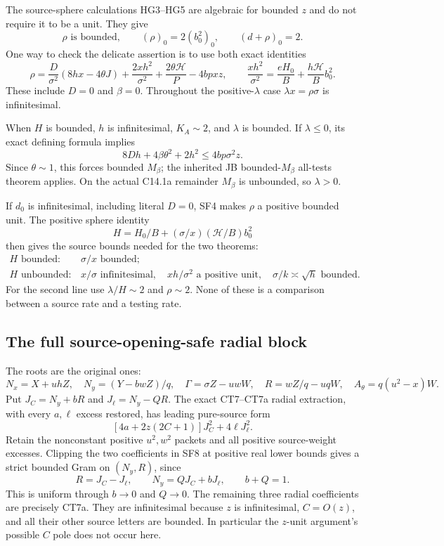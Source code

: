 The source-sphere calculations HG3--HG5 are algebraic for bounded
$z$ and do not require it to be a unit. They give
\[
 \rho\text{ is bounded},\qquad
 (\rho)_0=2(b_0^2)_0,\qquad (d+\rho)_0=2.
 \tag{SF4}
\]
One way to check the delicate assertion is to use both exact identities
\[
 \rho=\frac D{\sigma^2}(8hx-4\theta J)
       +\frac{2xh^2}{\sigma^2}
       +\frac{2\theta\mathcal H}{P}-4bpxz,
 \qquad
 \frac{xh^2}{\sigma^2}=\frac{eH_0}{B}
                         +\frac{h\mathcal H}{B}b_0^2.
 \tag{SF5}
\]
These include $D=0$ and $\beta=0$. Throughout the positive-$\lambda$
case $\lambda x=\rho\sigma$ is infinitesimal.

When $H$ is bounded, $h$ is infinitesimal, $K_A\sim2$, and
$\lambda$ is bounded. If $\lambda\le0$, its exact defining formula
implies
\[
 8Dh+4\beta\theta^2+2h^2\le4bp\sigma^2z.
\]
Since $\theta\sim1$, this forces bounded $M_\beta$; the inherited
JB bounded-$M_\beta$ all-tests theorem applies. On the actual
C14.1a remainder $M_\beta$ is unbounded, so $\lambda>0$.

If $d_0$ is infinitesimal, including literal $D=0$, SF4 makes
$\rho$ a positive bounded unit. The positive sphere identity
\[
 H=H_0/B+(\sigma/x)(\mathcal H/B)b_0^2
 \tag{SF6}
\]
then gives the source bounds needed for the two theorems:
\[
 \begin{array}{ll}
 H\text{ bounded}:&\sigma/x\text{ bounded};\\
 H\text{ unbounded}:&x/\sigma\text{ infinitesimal},\quad
                    xh/\sigma^2\text{ a positive unit},\quad
                    \sigma/k\asymp\sqrt h\text{ bounded}.
 \end{array}
 \tag{SF7}
\]
For the second line use $\lambda/H\sim2$ and $\rho\sim2$.
None of these is a comparison between a source rate and a testing rate.

\subsection{The full source-opening-safe radial block}

The roots are the original ones:
\[
 N_x=X+uhZ,\quad N_y=(Y-bwZ)/q,\quad
 \Gamma=\sigma Z-uwW,\quad R=wZ/q-uqW,\quad
 A_\theta=q(u^2-x)W.
\]
Put $J_C=N_y+bR$ and $J_\ell=N_y-QR$. The exact CT7--CT7a
radial extraction, with every $a,\ell$ excess restored, has leading
pure-source form
\[
 [4a+2z(2C+1)]J_C^2+4\ell J_\ell^2.
 \tag{SF8}
\]
Retain the nonconstant positive $u^2,w^2$ packets and all positive
source-weight excesses. Clipping the two coefficients in SF8 at
positive real lower bounds gives a strict bounded Gram on $(N_y,R)$,
since
\[
 R=J_C-J_\ell,\qquad N_y=QJ_C+bJ_\ell,
 \qquad b+Q=1.
\]
This is uniform through $b\to0$ and $Q\to0$. The remaining three
radial coefficients are precisely CT7a. They are infinitesimal
because $z$ is infinitesimal, $C=O(z)$, and all their other source
letters are bounded. In particular the $z$-unit argument's possible
$C$ pole does not occur here.


